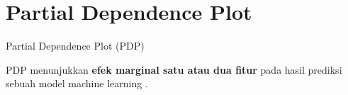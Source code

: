 \documentclass[aspectratio=169]{beamer}
\begin{document}
\section{Partial Dependence Plot}
\begin{frame}{Partial Dependence Plot (PDP)}
	\begin{vfilleditems}
		\item PDP menunjukkan \textbf{efek marginal satu atau dua fitur} pada hasil prediksi sebuah model machine learning \citep{friedman2001greedy}.
		\item 
	\end{vfilleditems}
\end{frame}



%
%
%
\end{document}
